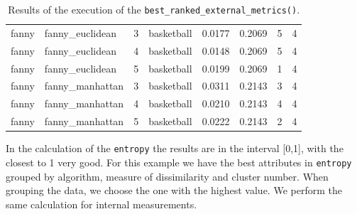 \begin{itemize}
\begin{table}[h!]
\begin{tabular}{| p{1cm} | p{1.8cm} | p{0.9cm} | p{1.1cm} | p{1.6cm} | p{0.8cm} | p{1.8cm} | p{1.5cm} |}
\hline
\scriptsize fanny      & \scriptsize fanny\_euclidean & \scriptsize     3     & \scriptsize basketball  & \scriptsize     0.0177    & \scriptsize 0.2069 &  \scriptsize        5        & \scriptsize      4 \\
\scriptsize fanny      & \scriptsize fanny\_euclidean & \scriptsize     4     & \scriptsize basketball  & \scriptsize     0.0148    & \scriptsize 0.2069 &  \scriptsize        5        & \scriptsize      4 \\
\scriptsize fanny      & \scriptsize fanny\_euclidean & \scriptsize     5     & \scriptsize basketball  & \scriptsize     0.0199    & \scriptsize 0.2069 &  \scriptsize        1        & \scriptsize      4 \\
\cline{2-8}
\scriptsize fanny      & \scriptsize fanny\_manhattan & \scriptsize     3     & \scriptsize basketball  & \scriptsize     0.0311    & \scriptsize 0.2143 &  \scriptsize        3        & \scriptsize      4 \\
\scriptsize fanny      & \scriptsize fanny\_manhattan & \scriptsize     4     & \scriptsize basketball  & \scriptsize     0.0210    & \scriptsize 0.2143 &  \scriptsize        4        & \scriptsize      4 \\
\scriptsize fanny      & \scriptsize fanny\_manhattan & \scriptsize     5     & \scriptsize basketball  & \scriptsize     0.0222    & \scriptsize 0.2143 &  \scriptsize        2        & \scriptsize      4 \\
\hline
\end{tabular}
\caption{Results of the execution of the \texttt{best\_ranked\_external\_metrics()}.}
\label{tab:clusteringbestrankedexternalmetrics}
\end{table}

In the calculation of the \texttt{entropy} the results are in the interval [0,1], with the closest to 1 very good. For this example we have the best attributes in \texttt{entropy} grouped by algorithm, measure of dissimilarity and cluster number. When grouping the data, we choose the one with the highest value. We perform the same calculation for internal measurements.


\end{itemize}
